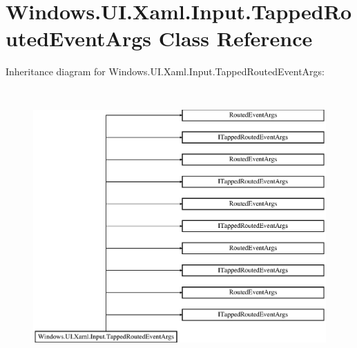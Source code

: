 \hypertarget{class_windows_1_1_u_i_1_1_xaml_1_1_input_1_1_tapped_routed_event_args}{}\section{Windows.\+U\+I.\+Xaml.\+Input.\+Tapped\+Routed\+Event\+Args Class Reference}
\label{class_windows_1_1_u_i_1_1_xaml_1_1_input_1_1_tapped_routed_event_args}
Inheritance diagram for Windows.\+U\+I.\+Xaml.\+Input.\+Tapped\+Routed\+Event\+Args\+:\begin{figure}[H]
\begin{center}
\leavevmode
\includegraphics[height=10.547945cm]{class_windows_1_1_u_i_1_1_xaml_1_1_input_1_1_tapped_routed_event_args}
\end{center}
\end{figure}
